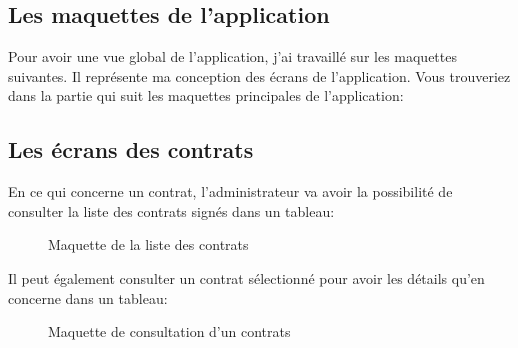 \documentclass[a4paper]{report}
\begin{document}
\begin{doublespace}
	\section{Les maquettes de l'application}

	Pour avoir une vue global de l'application, j'ai travaillé sur les maquettes suivantes. Il représente ma
	conception des écrans de l'application. Vous trouveriez dans la partie qui suit les maquettes principales
	de l'application:

	\subsection{Les écrans des contrats}

	En ce qui concerne un contrat, l'administrateur va avoir la possibilité de consulter la liste des contrats signés dans un tableau:
	\begin{figure}[H]
		\begin{center}
			\caption{Maquette de la liste des contrats}
		\end{center}
	\end{figure}

	Il peut également consulter un contrat sélectionné pour avoir les détails qu’en concerne dans un tableau:
	\begin{figure}[H]
		\begin{center}
			\caption{Maquette de consultation d'un contrats}
		\end{center}
	\end{figure}


\end{doublespace}
\end{document}

